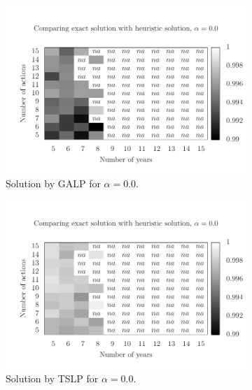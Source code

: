 \begin{figure}
  \begin{subfigure}{0.45\textwidth}
    \includegraphics[scale=0.5, trim=0.75cm 0.55cm 0 2cm, clip=true]{imgs/comp_very_hard.pdf}
    \caption{Solution by GALP for $\alpha=0.0$.}
    \label{fig:mh1_1}
  \end{subfigure}
  \begin{subfigure}{0.45\textwidth}
    \includegraphics[scale=0.5, trim=0.75cm 0.55cm 0 2cm, clip=true]{imgs/comp_very_hard_ts.pdf}
    \caption{Solution by TSLP for $\alpha=0.0$.}
    \label{fig:mh2_1}
  \end{subfigure} 
  \begin{subfigure}{0.45\textwidth}

\end{subfigure}
\end{figure}
